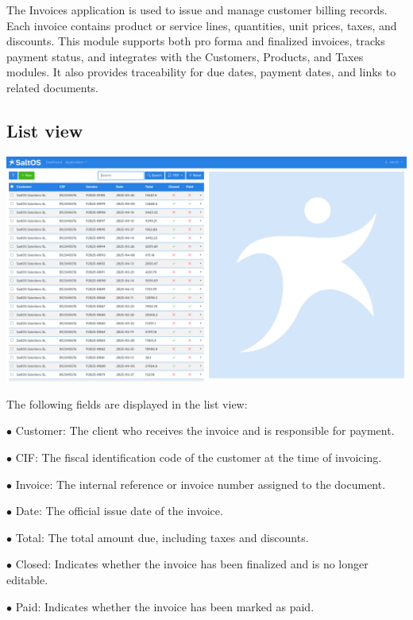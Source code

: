 \documentclass[a4paper]{article}
\begin{document}
The Invoices application is used to issue and manage customer billing records.
Each invoice contains product or service lines, quantities, unit prices, taxes, and discounts.
This module supports both pro forma and finalized invoices, tracks payment status,
and integrates with the Customers, Products, and Taxes modules.
It also provides traceability for due dates, payment dates, and links to related documents.

\hypertarget{toc138}{}
\subsection{List view}

\begin{center}\includegraphics[width=1\textwidth]{../ujest/snaps/test-screenshots-js-screenshots-sales-invoices-list-en-us-1-snap.png}\end{center}

The following fields are displayed in the list view:

\begin{compactitem}
\item[\color{myblue}$\bullet$] Customer: The client who receives the invoice and is responsible for payment.
\item[\color{myblue}$\bullet$] CIF: The fiscal identification code of the customer at the time of invoicing.
\item[\color{myblue}$\bullet$] Invoice: The internal reference or invoice number assigned to the document.
\item[\color{myblue}$\bullet$] Date: The official issue date of the invoice.
\item[\color{myblue}$\bullet$] Total: The total amount due, including taxes and discounts.
\item[\color{myblue}$\bullet$] Closed: Indicates whether the invoice has been finalized and is no longer editable.
\item[\color{myblue}$\bullet$] Paid: Indicates whether the invoice has been marked as paid.
\end{compactitem}
\end{document}
